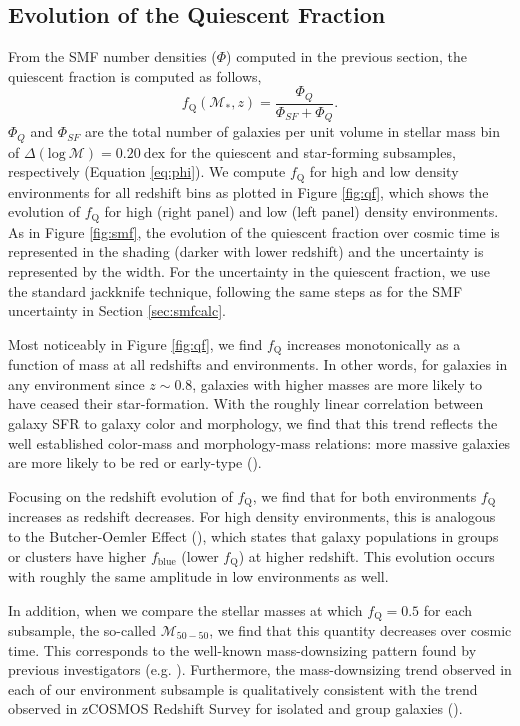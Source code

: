 \documentclass{emulateapj}
\begin{document}
\subsection{Evolution of the Quiescent Fraction} \label{sec:qfevol}
From the SMF number densities ($\Phi$) computed in the previous section, the quiescent fraction is computed as follows, 
\begin{equation}
f_{\mathrm{Q}} ( \mathcal{M}_{*}, z)= \frac{\Phi_{Q}}{\Phi_{SF}+\Phi_{Q}}.
\end{equation}
$\Phi_{Q}$ and $\Phi_{SF}$ are the total number of galaxies per unit
volume in stellar mass bin of $\Delta(\mathrm{log} \: \mathcal{M}) = 0.20
\: \mathrm{dex}$ for the quiescent and star-forming subsamples,
respectively (Equation \ref{eq:phi}). We compute $f_{\mathrm{Q}}$ for high
and low density environments for all redshift bins as plotted in
Figure \ref{fig:qf}, which shows the evolution of $f_{\mathrm{Q}}$ for
high (right panel) and low (left panel) density environments. As in
Figure \ref{fig:smf}, the evolution of the quiescent fraction over
cosmic time is represented in the shading (darker with lower redshift)
and the uncertainty is represented by the width. For the uncertainty
in the quiescent fraction, we use the standard jackknife technique,
following the same steps as for the SMF uncertainty in Section \ref{sec:smfcalc}. 

Most noticeably in Figure \ref{fig:qf}, we find $f_{\mathrm{Q}}$ increases
monotonically as a function of mass at all redshifts and
environments. In other words, for galaxies in any environment since $ z \sim 0.8$, galaxies with higher
masses are more likely to have ceased their star-formation. With the roughly linear correlation between galaxy SFR to galaxy color and morphology, we find that this trend reflects the well established color-mass and morphology-mass relations: more massive galaxies are more likely to be red or early-type (\citealt{blanton09a}). 

Focusing on the redshift evolution of $f_{\mathrm{Q}}$, we find that for
both environments $f_{\mathrm{Q}}$ increases as redshift decreases. For
high density environments, this is analogous to the Butcher-Oemler
Effect (\citealt{Butcher:1984aa}), which states that galaxy
populations in groups or clusters have higher $f_{\mathrm{blue}}$ 
(lower $f_{\mathrm{Q}}$) at higher redshift. This evolution occurs with
roughly the same amplitude in low environments as well.

In addition, when we compare the stellar masses at which $f_{\mathrm{Q}} =
0.5$ for each subsample, the so-called $\mathcal{M}_{50-50}$, we find
that this quantity decreases over cosmic time. This corresponds to the
well-known mass-downsizing pattern found by previous investigators
(e.g. \citealt{bundy06a}). Furthermore, the mass-downsizing trend
observed in each of our environment subsample is qualitatively
consistent with the trend observed in zCOSMOS Redshift Survey for
isolated and group galaxies (\citealt{Iovino:2010aa}).
\end{document}
